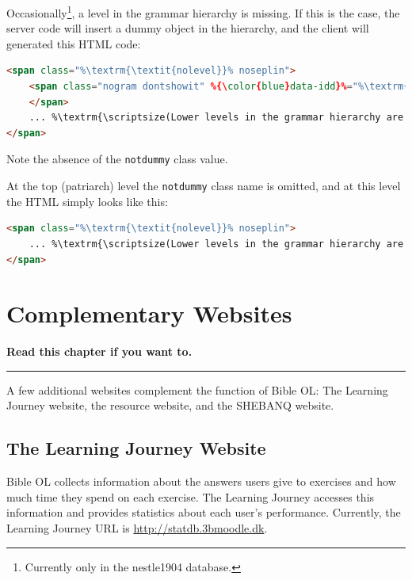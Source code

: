 \documentclass[11pt,oneside,a4paper]{memoir}
\newcommand*{\xmla}[1]{\texttt{#1}} %
\begin{document}
Occasionally\footnote{Currently only in the nestle1904 database.}, a level in the grammar hierarchy
is missing. If this is the case, the server code will insert a dummy object in the hierarchy, and
the client will generated this HTML code:

\begin{lstlisting}[language=HTML]
<span class="%\textrm{\textit{nolevel}}% noseplin">
    <span class="nogram dontshowit" %{\color{blue}data-idd}%="%\textrm{\textit{ID\_D}}%">%\textrm{\textit{loctype}}%
    </span>
    ... %\textrm{\scriptsize(Lower levels in the grammar hierarchy are inserted here)}%
</span>
\end{lstlisting}

Note the absence of the \xmla{notdummy} class value.


At the top (patriarch) level the \xmla{notdummy} class name is omitted, and at this level the HTML
simply looks like this:

\begin{lstlisting}[language=HTML]
<span class="%\textrm{\textit{nolevel}}% noseplin">
    ... %\textrm{\scriptsize(Lower levels in the grammar hierarchy are inserted here)}%
</span>
\end{lstlisting}



\chapter{Complementary Websites}

\textbf{Read this chapter if you want to.}
\plainbreak{3}


A few additional websites complement the function of Bible OL: The Learning Journey website, the
resource website, and the SHEBANQ website.

\section{The Learning Journey Website}

Bible OL collects information about the answers users give to exercises and how much time they spend
on each exercise. The Learning Journey accesses this information and provides statistics about each
user's performance. Currently, the Learning Journey URL is \url{http://statdb.3bmoodle.dk}.
\end{document}
